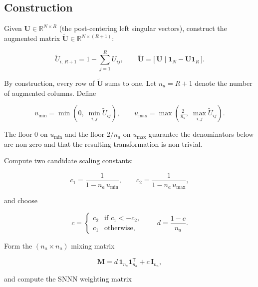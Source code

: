 \documentclass[11pt]{article}
\theoremstyle{definition}
\theoremstyle{plain}
\newcommand{\R}{\mathbb{R}}
\newcommand{\mat}[1]{\mathbf{#1}}
\newcommand{\ones}{\mathbf{1}}
\newcommand{\T}{\mathsf{T}}
\begin{document}
\subsection{Construction}

Given $\mat{U} \in \R^{N \times R}$ (the post-centering left singular
vectors), construct the augmented matrix $\tilde{\mat{U}} \in \R^{N \times (R+1)}$:

\begin{equation}
  \tilde{U}_{i,\,R+1} = 1 - \sum_{j=1}^{R} U_{ij},
  \qquad
  \tilde{\mat{U}} = \bigl[\,\mat{U}\;\big|\;\ones_N - \mat{U}\ones_R\,\bigr].
  \label{eq:augment}
\end{equation}

By construction, every row of $\tilde{\mat{U}}$ sums to one.  Let
$n_a = R+1$ denote the number of augmented columns.  Define

\begin{equation}
  u_{\min} = \min(0,\;\min_{i,j}\tilde{U}_{ij}),
  \qquad
  u_{\max} = \max\!\left(\tfrac{2}{n_a},\;\max_{i,j}\tilde{U}_{ij}\right).
  \label{eq:umin_umax}
\end{equation}

The floor $0$ on $u_{\min}$ and the floor $2/n_a$ on $u_{\max}$
guarantee the denominators below are non-zero and that the resulting
transformation is non-trivial.

Compute two candidate scaling constants:

\begin{equation}
  c_1 = \frac{1}{1 - n_a\,u_{\min}}, \qquad
  c_2 = \frac{1}{1 - n_a\,u_{\max}},
  \label{eq:c1c2}
\end{equation}

and choose

\begin{equation}
  c = \begin{cases} c_2 & \text{if } c_1 < -c_2, \\ c_1 & \text{otherwise,} \end{cases}
  \qquad
  d = \frac{1-c}{n_a}.
  \label{eq:c_choice}
\end{equation}

Form the $(n_a \times n_a)$ mixing matrix

\begin{equation}
  \mat{M} = d\,\ones_{n_a}\ones_{n_a}^\T + c\,\mat{I}_{n_a},
  \label{eq:M}
\end{equation}

and compute the SNNN weighting matrix
\end{document}
